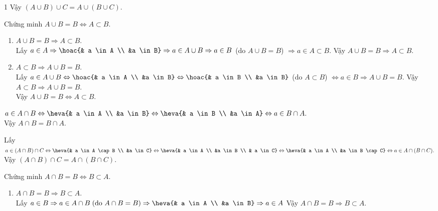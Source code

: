 \begin{bt}
{\begin{enumEX}{1}
			Vậy $(A \cup B) \cup C = A  \cup (B \cup C)$.
			\item Chứng minh $A \cup B = B \Leftrightarrow A \subset  B$.
			\begin{enumerate}
				\item[Thuận:] $A \cup B = B \Rightarrow A \subset B$.\\ Lấy $a \in A \Rightarrow \hoac{& a \in A \\ &a \in B} \Rightarrow a \in A \cup B \Rightarrow a \in B$ (do $A \cup  B = B$) $\Rightarrow a \in A \subset B$. Vậy $A \cup B = B \Rightarrow A \subset B$.
				\item[Đảo:] $ A  \subset B \Rightarrow A \cup B = B $. \\
				Lấy $a \in A \cup B \Leftrightarrow \hoac{& a \in A \\ &a \in B} \Leftrightarrow \hoac{& a \in B \\ &a \in B}$ (do $A \subset B$) $\Leftrightarrow a \in B \Rightarrow A \cup B = B$. Vậy $ A \subset  B \Rightarrow A \cup B = B $. \\
				Vậy $A \cup B = B  \Leftrightarrow A \subset B$.
			\end{enumerate}
			\item $a \in A \cap B \Leftrightarrow \heva{& a \in A \\  &a \in B} \Leftrightarrow \heva{& a \in B \\ &a \in A} \Leftrightarrow a \in B \cap A.$\\
			Vậy  $A \cap B = B \cap A$.
			\item Lấy $a \in (A \cap B) \cap C \Leftrightarrow \heva{& a \in A \cap B \\ &a \in C} \Leftrightarrow \heva{& a \in A  \\ &a \in B \\ & a \in C} \Leftrightarrow \heva{& a \in A \\ &a \in B \cap C} \Leftrightarrow a \in A \cap (B \cap C).$\\
			Vậy $(A \cap B) \cap  C = A \cap (B \cap C)$.
			\item Chứng minh $A \cap B = B \Leftrightarrow B  \subset A$.
			\begin{enumerate}
				\item[Thuận:] $A \cap B = B  \Rightarrow B \subset A$.\\ Lấy $a \in B \Rightarrow a \in A \cap B \; (\text{do } A \cap B = B) \Rightarrow \heva{& a \in A \\ &a \in B} \Rightarrow a \in A$ Vậy $A \cap B = B \Rightarrow B \subset A$.

\end{enumerate}
\end{enumEX}}
\end{bt}
